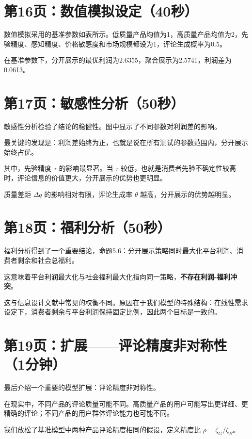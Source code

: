 \documentclass[12pt,a4paper]{article}
\begin{document}
\section*{第16页：数值模拟设定（40秒）}

数值模拟采用的基准参数如表所示。低质量产品均值为1，高质量产品均值为2，先验精度、感知精度、价格敏感度和市场规模都设为1，评论生成概率为0.5。

在基准参数下，分开展示的最优利润为2.6355，聚合展示为2.5741，利润差为0.0613。

\section*{第17页：敏感性分析（50秒）}

敏感性分析检验了结论的稳健性。图中显示了不同参数对利润差的影响。

最关键的发现是：利润差始终为正，也就是说在所有测试的参数范围内，分开展示始终占优。

其中，先验精度 $\tau$ 的影响最显著。当 $\tau$ 较低，也就是消费者先验不确定性较高时，评论信息的价值更大，分开展示的优势也更明显。

质量差距 $\Delta q$ 的影响相对有限，评论生成率 $\theta$ 越高，分开展示的优势越明显。

\section*{第18页：福利分析（50秒）}

福利分析得到了一个重要结论，命题5.6：分开展示策略同时最大化平台利润、消费者剩余和社会总福利。

这意味着平台利润最大化与社会福利最大化指向同一策略，\textbf{不存在利润-福利冲突}。

这与信息设计文献中常见的权衡不同。原因在于我们模型的特殊结构：在线性需求设定下，消费者剩余与平台利润保持固定比例，因此两个目标是一致的。

\section*{第19页：扩展——评论精度非对称性（1分钟）}

最后介绍一个重要的模型扩展：评论精度非对称性。

在现实中，不同产品的评论质量可能不同。高质量产品的用户可能写出更详细、更精确的评论；不同产品的用户群体评论能力也可能不同。

我们放松了基准模型中两种产品评论精度相同的假设，定义精度比 $\rho = \zeta_G / \zeta_B$。
\end{document}

